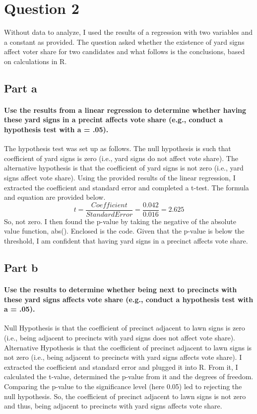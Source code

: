 \documentclass{article}
\begin{document}
	\section{Question 2}
	Without data to analyze, I used the results of a regression with two variables and a constant as provided. The question asked whether the existence of yard signs affect voter share for two candidates and what follows is the conclusions, based on calculations in R.  
	\subsection{Part a}
	\paragraph{Use the results from a linear regression to determine whether having these yard signs in a precint affects vote share (e.g., conduct a hypothesis test with a = .05).}
	The hypothesis test was set up as follows. The null hypothesis is such that coefficient of yard signs is zero (i.e., yard signs do not affect vote share). The alternative hypothesis is that the coefficient of yard signs is not zero (i.e., yard signs affect vote share). Using the provided results of the linear regression, I extracted the coefficient and standard error and completed a t-test. The formula and equation are provided below. 
	\begin{equation}
		t = \frac{Coefficient}{Standard Error} = \frac{0.042}{0.016} = 2.625
	\end{equation}
	So, not zero. I then found the p-value by taking the negative of the absolute value function, abs(). Enclosed is the code. Given that the p-value is below the threshold, I am confident that having yard signs in a precinct affects vote share.  
	\subsection{Part b}
	\paragraph{Use the results to determine whether being next to precincts with these yard signs affects vote share (e.g., conduct a hypothesis test with a = .05).}
	Null Hypothesis is that the coefficient of precinct adjacent to lawn signs is zero (i.e., being adjacent to precincts with yard signs does not affect vote share).
	Alternative Hypothesis is that the coefficient of precinct adjacent to lawn signs is not zero (i.e., being adjacent to precincts with yard signs affects vote share). I extracted the coefficient and standard error and plugged it into R. From it, I calculated the t-value, determined the p-value from it and the degrees of freedom. Comparing the p-value to the significance level (here 0.05) led to rejecting the null hypothesis. So, the coefficient of precinct adjacent to lawn signs is not zero and thus, being adjacent to precincts with yard signs affects vote share.
\end{document}
